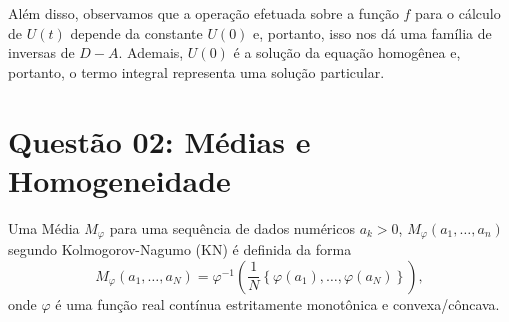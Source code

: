 Além disso, observamos que a operação efetuada sobre a função \(f\) para o cálculo de \(U(t)\) depende da constante \(U(0)\) e, portanto, isso nos dá uma família de inversas de \(D-A\). Ademais, \(U(0)\) é a solução da equação homogênea e, portanto, o termo integral representa uma solução particular.




\clearpage
\chapter*{Questão 02: Médias e Homogeneidade}

Uma Média $M_\varphi$ para uma sequência de dados numéricos $a_k > 0$, $M_\varphi(a_1, \ldots, a_n)$ segundo Kolmogorov-Nagumo (KN) é definida da forma
\[M_\varphi(a_1, \ldots, a_N) = \varphi^{-1}\left(\dfrac{1}{N} \left\{\varphi(a_1), \ldots, \varphi(a_N)\right\}\right),\]
onde $\varphi$ é uma função real contínua estritamente monotônica e convexa/côncava.

